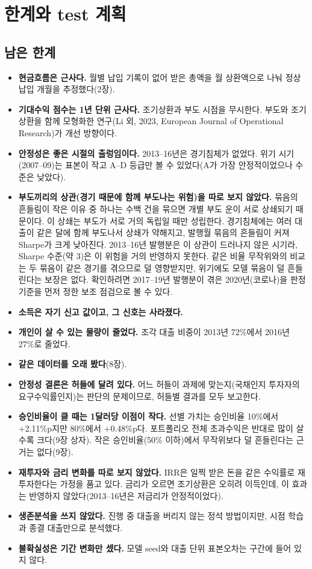 \chapter{한계와 test 계획}

\section{남은 한계}
\begin{itemize}[leftmargin=*]
\item \textbf{현금흐름은 근사다.} 월별 납입 기록이 없어 받은 총액을 월 상환액으로 나눠 정상 납입 개월을 추정했다(2장).
\item \textbf{기대수익 점수는 1년 단위 근사다.} 조기상환과 부도 시점을 무시한다. 부도와 조기상환을 함께 모형화한 연구(Li 외, 2023, European Journal of Operational Research)가 개선 방향이다.
\item \textbf{안정성은 좋은 시절의 출렁임이다.} 2013--16년은 경기침체가 없었다. 위기 시기(2007--09)는 표본이 작고 A--D 등급만 볼 수 있었다(A가 가장 안정적이었으나 수준은 낮았다).
\item \textbf{부도끼리의 상관(경기 때문에 함께 부도나는 위험)을 따로 보지 않았다.} 묶음의 흔들림이 작은 이유 중 하나는 수백 건을 묶으면 개별 부도 운이 서로 상쇄되기 때문이다. 이 상쇄는 부도가 서로 거의 독립일 때만 성립한다. 경기침체에는 여러 대출이 같은 달에 함께 부도나서 상쇄가 약해지고, 발행월 묶음의 흔들림이 커져 Sharpe가 크게 낮아진다. 2013--16년 발행분은 이 상관이 드러나지 않은 시기라, Sharpe 수준(약 3)은 이 위험을 거의 반영하지 못한다. 같은 비율 무작위와의 비교는 두 묶음이 같은 경기를 겪으므로 덜 영향받지만, 위기에도 모델 묶음이 덜 흔들린다는 보장은 없다. 확인하려면 2017--19년 발행분이 겪은 2020년(코로나)을 판정 기준을 먼저 정한 보조 점검으로 볼 수 있다.
\item \textbf{소득은 자기 신고 값이고, 그 신호는 사라졌다.}
\item \textbf{개인이 살 수 있는 물량이 줄었다.} 조각 대출 비중이 2013년 72\%에서 2016년 27\%로 줄었다.
\item \textbf{같은 데이터를 오래 봤다}(8장).
\item \textbf{안정성 결론은 허들에 달려 있다.} 어느 허들이 과제에 맞는지(국채인지 투자자의 요구수익률인지)는 판단의 문제이므로, 허들별 결과를 모두 보고한다.
\item \textbf{승인비율이 클 때는 1달러당 이점이 작다.} 선별 가치는 승인비율 10\%에서 +2.11\%p지만 80\%에서 +0.48\%p다. 포트폴리오 전체 초과수익은 반대로 많이 살수록 크다(9장 상자). 작은 승인비율(50\% 이하)에서 무작위보다 덜 흔들린다는 근거는 없다(9장).
\item \textbf{재투자와 금리 변화를 따로 보지 않았다.} IRR은 일찍 받은 돈을 같은 수익률로 재투자한다는 가정을 품고 있다. 금리가 오르면 조기상환은 오히려 이득인데, 이 효과는 반영하지 않았다(2013--16년은 저금리가 안정적이었다).
\item \textbf{생존분석을 쓰지 않았다.} 진행 중 대출을 버리지 않는 정석 방법이지만, 시점 학습과 종결 대출만으로 분석했다.
\item \textbf{불확실성은 기간 변화만 셌다.} 모델 seed와 대출 단위 표본오차는 구간에 들어 있지 않다.
\end{itemize}

